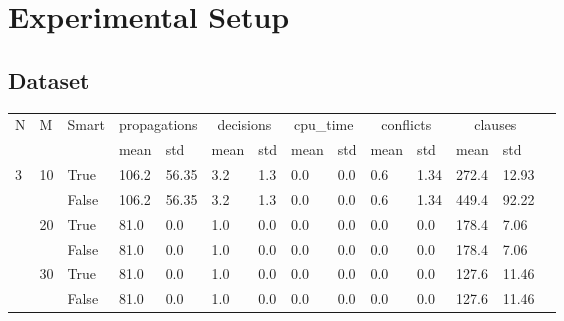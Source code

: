 \section{Experimental Setup}

\subsection{Dataset}

\begin{landscape}
\begin{small}
\begin{longtable}[c]{@{}lll|ll|ll|ll|ll|lll@{}}
\toprule
N  & M  & Smart & \multicolumn{2}{c}{propagations} & \multicolumn{2}{c}{decisions} & \multicolumn{2}{c}{cpu\_time} & \multicolumn{2}{c}{conflicts} & \multicolumn{2}{c}{clauses} &  \\* 
   &    &       & mean            & std            & mean          & std           & mean          & std           & mean          & std           & mean          & std         &  \\
  \midrule
\endfirsthead
%
\endhead
%
\bottomrule
\endfoot
%
\endlastfoot
%
3  & 10 & True  & 106.2           & 56.35          & 3.2           & 1.3           & 0.0           & 0.0           & 0.6           & 1.34          & 272.4         & 12.93       &  \\
   &    & False & 106.2           & 56.35          & 3.2           & 1.3           & 0.0           & 0.0           & 0.6           & 1.34          & 449.4         & 92.22       &  \\
   & 20 & True  & 81.0            & 0.0            & 1.0           & 0.0           & 0.0           & 0.0           & 0.0           & 0.0           & 178.4         & 7.06        &  \\
   &    & False & 81.0            & 0.0            & 1.0           & 0.0           & 0.0           & 0.0           & 0.0           & 0.0           & 178.4         & 7.06        &  \\
   & 30 & True  & 81.0            & 0.0            & 1.0           & 0.0           & 0.0           & 0.0           & 0.0           & 0.0           & 127.6         & 11.46       &  \\
   &    & False & 81.0            & 0.0            & 1.0           & 0.0           & 0.0           & 0.0           & 0.0           & 0.0           & 127.6         & 11.46       &  \\

\end{longtable}
\end{small}
\end{landscape}

